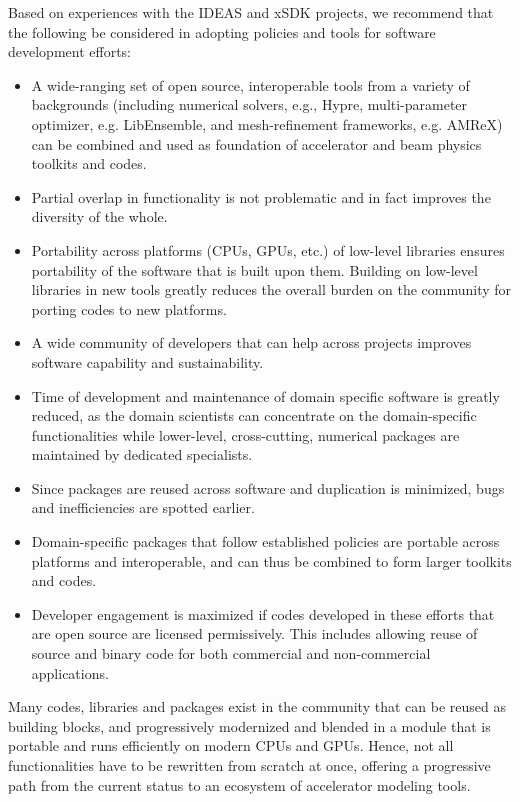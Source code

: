 \documentclass[11pt,sort&compress]{article}
\begin{document}
Based on experiences with the IDEAS and xSDK projects, we recommend that the following be considered in adopting policies and tools for software development efforts:
\begin{itemize}
    \item A wide-ranging set of open source, interoperable tools from a variety of backgrounds (including numerical solvers, e.g., Hypre, multi-parameter optimizer, e.g. LibEnsemble, and mesh-refinement frameworks, e.g. AMReX) can be combined and used as foundation of accelerator and beam physics toolkits and codes.
    \item Partial overlap in functionality is not problematic and in fact improves the diversity of the whole.
    \item Portability across platforms (CPUs, GPUs, etc.) of low-level libraries ensures portability of the software that is built upon them.  Building on low-level libraries in new tools greatly reduces the overall burden on the community for porting codes to new platforms.
    \item A wide community of developers that can help across projects improves software capability and sustainability.
    \item Time of development and maintenance of domain specific software is greatly reduced, as the domain scientists can concentrate on the domain-specific functionalities while lower-level, cross-cutting, numerical packages are maintained by dedicated specialists.
    \item Since packages are reused across software and duplication is minimized, bugs and inefficiencies are spotted earlier.
    \item Domain-specific packages that follow established policies are portable across platforms and interoperable, and can thus be combined to form larger toolkits and codes.
    \item Developer engagement is maximized if codes developed in these efforts that are open source are licensed permissively.  This includes allowing reuse of source and binary code for both commercial and non-commercial applications.
\end{itemize}

Many codes, libraries and packages exist in the community that can be reused as building blocks, and progressively modernized and blended in a module that is portable and runs efficiently on modern CPUs and GPUs. Hence, not all functionalities have to be rewritten from scratch at once, offering a progressive path from the current status to an ecosystem of accelerator modeling tools. 
\end{document}
